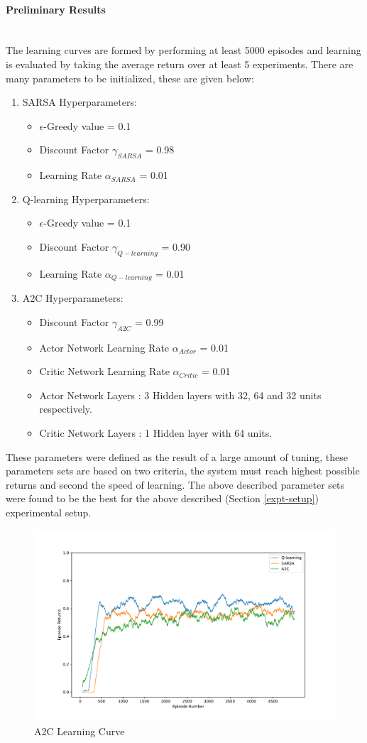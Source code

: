 \documentclass[14pt]{extarticle}
\newcommand{\myparagraph}[1]{\paragraph{#1}\mbox{}\\ \linebreak}
\numberwithin{equation}{section}
\begin{document}
	\myparagraph{Preliminary Results}
	The learning curves are formed by performing at least 5000 episodes and learning is evaluated by taking the average return over at least 5 experiments. There are many parameters to be initialized, these are given below:
\begin{enumerate}
	\item SARSA Hyperparameters:
			\begin{itemize}
		\item $\epsilon$-Greedy value = 0.1
		\item Discount Factor $\gamma_{SARSA}$ = 0.98
		\item Learning Rate $\alpha_{SARSA}$ = 0.01
			\end{itemize}
	\item Q-learning Hyperparameters:
		\begin{itemize}
	\item $\epsilon$-Greedy value = 0.1
	\item Discount Factor $\gamma_{Q-learning}$ = 0.90
	\item Learning Rate $\alpha_{Q-learning}$ = 0.01
		\end{itemize}
		\item A2C Hyperparameters:
		\begin{itemize}
		\item Discount Factor $\gamma_{A2C}$ = 0.99
		\item Actor Network Learning Rate $\alpha_{Actor}$ = 0.01
		\item Critic Network Learning Rate $\alpha_{Critic}$ = 0.01
		\item Actor Network Layers : 3 Hidden layers with 32, 64 and 32 units respectively.
		\item Critic Network Layers : 1 Hidden layer with 64 units.
		\end{itemize}
	\end{enumerate}
	These parameters were defined as the result of a large amount of tuning, these parameters sets are based on two criteria, the system must reach highest possible returns and second the speed of learning. The above described parameter sets were found to be the best for the above described (Section \ref{expt-setup}) experimental setup. 
	\begin{figure}[H]
	\hspace*{-3.25cm}   
	\centering
	\includegraphics[scale=0.8]{plota2c_250_3.pdf}
	\caption{A2C Learning Curve
		\label{a2c-plot}}
\end{figure}
\end{document}
